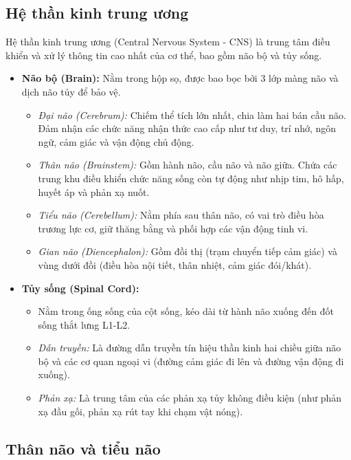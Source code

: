 \subsection{Hệ thần kinh trung ương}

Hệ thần kinh trung ương (Central Nervous System - CNS) là trung tâm điều khiển và xử lý thông tin cao nhất của cơ thể, bao gồm não bộ và tủy sống.

\begin{itemize}
    \item \textbf{Não bộ (Brain):} Nằm trong hộp sọ, được bao bọc bởi 3 lớp màng não và dịch não tủy để bảo vệ.
    \begin{itemize}
        \item \textit{Đại não (Cerebrum):} Chiếm thể tích lớn nhất, chia làm hai bán cầu não. Đảm nhận các chức năng nhận thức cao cấp như tư duy, trí nhớ, ngôn ngữ, cảm giác và vận động chủ động.
        \item \textit{Thân não (Brainstem):} Gồm hành não, cầu não và não giữa. Chứa các trung khu điều khiển chức năng sống còn tự động như nhịp tim, hô hấp, huyết áp và phản xạ nuốt.
        \item \textit{Tiểu não (Cerebellum):} Nằm phía sau thân não, có vai trò điều hòa trương lực cơ, giữ thăng bằng và phối hợp các vận động tinh vi.
        \item \textit{Gian não (Diencephalon):} Gồm đồi thị (trạm chuyển tiếp cảm giác) và vùng dưới đồi (điều hòa nội tiết, thân nhiệt, cảm giác đói/khát).
    \end{itemize}

    \item \textbf{Tủy sống (Spinal Cord):} 
    \begin{itemize}
        \item Nằm trong ống sống của cột sống, kéo dài từ hành não xuống đến đốt sống thắt lưng L1-L2.
        \item \textit{Dẫn truyền:} Là đường dẫn truyền tín hiệu thần kinh hai chiều giữa não bộ và các cơ quan ngoại vi (đường cảm giác đi lên và đường vận động đi xuống).
        \item \textit{Phản xạ:} Là trung tâm của các phản xạ tủy không điều kiện (như phản xạ đầu gối, phản xạ rút tay khi chạm vật nóng).
    \end{itemize}
\end{itemize}

\subsection{Thân não và tiểu não}


